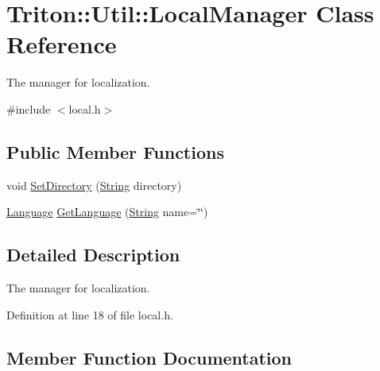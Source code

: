 \hypertarget{class_triton_1_1_util_1_1_local_manager}{}\section{Triton\+:\+:Util\+:\+:Local\+Manager Class Reference}
\label{class_triton_1_1_util_1_1_local_manager}


The manager for localization.  




{\ttfamily \#include $<$local.\+h$>$}

\subsection*{Public Member Functions}
\begin{DoxyCompactItemize}
\item 
void \hyperlink{class_triton_1_1_util_1_1_local_manager_a962122f655decc34b068b56118bc5b34}{Set\+Directory} (\hyperlink{namespace_triton_1_1_util_ab36ffddebe19fdd103ec60af3841d9e2}{String} directory)
\item 
\hyperlink{class_triton_1_1_util_1_1_language}{Language} \hyperlink{class_triton_1_1_util_1_1_local_manager_ae32d85010550cd6a5c76b5ae90263acf}{Get\+Language} (\hyperlink{namespace_triton_1_1_util_ab36ffddebe19fdd103ec60af3841d9e2}{String} name=\char`\"{}\char`\"{})
\end{DoxyCompactItemize}


\subsection{Detailed Description}
The manager for localization. 

Definition at line 18 of file local.\+h.



\subsection{Member Function Documentation}
\hypertarget{class_triton_1_1_util_1_1_local_manager_ae32d85010550cd6a5c76b5ae90263acf}{}
